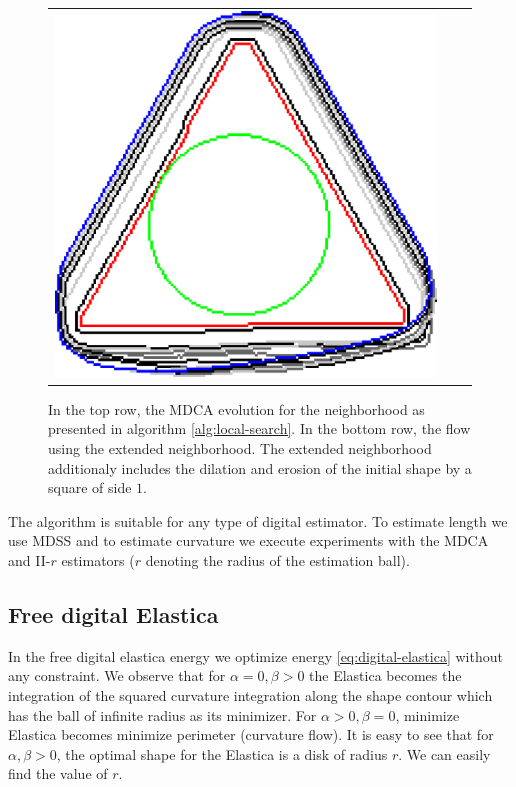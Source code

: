 \begin{figure}
\begin{tabular}{ccc}
\includegraphics[scale=0.25]{figures/chapter5/mdca-larger-neighborhood/triangle/0.01/0.25/summary.pdf}\\[2em]
\end{tabular}
\caption{In the top row, the MDCA evolution for the neighborhood as presented in algorithm \ref{alg:local-search}. In the bottom row, the flow using the extended neighborhood. The extended neighborhood additionaly includes the dilation and erosion of the initial shape by a square of side $1$.}
\label{fig:mdca-larger-neighborhood}
\end{figure}


The algorithm is suitable for any type of digital estimator. To estimate length we use MDSS and to estimate curvature we execute experiments with the MDCA and II-$r$ estimators ($r$ denoting the radius of the estimation ball). 


\subsection{Free digital Elastica}
\label{ch6:subsec:free-digital-elastica}
In the free digital elastica energy we optimize energy \ref{eq:digital-elastica} without any constraint. We observe that for $\alpha=0, \beta >0$ the Elastica becomes the integration of the squared curvature integration along the shape contour which has the ball of infinite radius as its minimizer. For $\alpha > 0, \beta=0$, minimize Elastica becomes minimize perimeter (curvature flow). It is easy to see that for $\alpha, \beta > 0$, the optimal shape for the Elastica is a disk of radius $r$. We can easily find the value of $r$.

